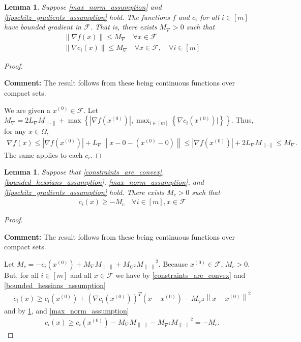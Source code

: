 \documentclass{article}
\newenvironment{comment}
  {\par\medskip
   \color{red}%
   \begin{framed}
   \textbf{Comment: }\ignorespaces}
 {\end{framed}
  \medskip}
\newtheorem{lemma}[theorem]{Lemma}
\theoremstyle{case}
\numberwithin{theorem}{subsection}
\newcommand{\feasible}{{\mathcal F}}
\newcommand{\gradf}{\nabla f}
\newcommand{\lipgrad}{{L_{\nabla}}}
\newcommand{\maxgrad}{{M_{\nabla}}}
\newcommand{\maxhessian}{{M_{\nabla^2}}}
\newcommand{\maxnorm}{{M_{\|\cdot\|}}}
\newcommand{\xinit}{{x^{(0)}}}
\begin{document}
\begin{lemma}
\label{bounded_gradients_lemma}
Suppose \cref{max_norm_assumption} and \cref{lipschitz_gradients_assumption} hold.
The functions $f$ and $c_i$ for all $ i \in [m]$ have bounded gradient in $ \feasible $.
That is, there exists $\maxgrad > 0$ such that
\begin{align}
\|\gradf(x)\| \le \maxgrad \quad  \forall x \in \feasible \\
\|\nabla c_i(x)\| \le \maxgrad \quad  \forall x \in \feasible, \quad \forall i \in [m]
\end{align}
\end{lemma}
\begin{proof}
\begin{comment}
The result follows from these being continuous functions over compact sets.
\end{comment}

We are given a $\xinit \in \feasible$. Let $\maxgrad = 2\lipgrad \maxnorm + \max\left\{|\gradf\left(\xinit\right)|, \max_{i \in [m]}\left\{\nabla c_i\left(\xinit\right)|\right\} \right\}$.
Thus, for any $x \in \Omega$,
\begin{align*}
\gradf(x) \le \left|\gradf\left(\xinit\right)\right| + \lipgrad \left\|x - 0 - \left(\xinit - 0\right)\right\| \le \left|\gradf\left(\xinit\right)\right| + 2\lipgrad \maxnorm \le \maxgrad.
\end{align*}
The same applies to each $c_i$.
\end{proof}


\begin{lemma}
\label{maximum_constraint_value_lemma}
Suppose that \cref{constraints_are_convex}, \cref{bounded_hessians_assumption}, \cref{max_norm_assumption}, and \cref{lipschitz_gradients_assumption} hold.
There exists $M_c>0$ such that
\begin{align*}
c_i(x) \ge -M_c \quad \forall i \in [m], x \in \feasible
\end{align*}
\end{lemma}
\begin{proof}
\begin{comment}
The result follows from these being continuous functions over compact sets.
\end{comment}

Let $M_c = -c_i\left(\xinit\right) + \maxgrad\maxnorm + \maxhessian \maxnorm^2$.
Because $\xinit \in\feasible$, $M_c > 0$.
But, for all $i \in [m]$ and all $x \in \feasible$ we have by 
\cref{constraints_are_convex} and \cref{bounded_hessians_assumption}
\begin{align*}
c_i(x) \ge c_i\left(\xinit\right) + \left(\nabla c_i\left(\xinit\right)\right)^T\left(x - \xinit\right) - \maxhessian \left\|x - \xinit\right\|^2
\end{align*}
and by \cref{bounded_gradients_lemma}, and \cref{max_norm_assumption}
\begin{align*}
c_i(x) \ge c_i\left(\xinit\right) - \maxgrad\maxnorm - \maxhessian \maxnorm^2 = -M_c.
\end{align*}
\end{proof}
\end{document}
